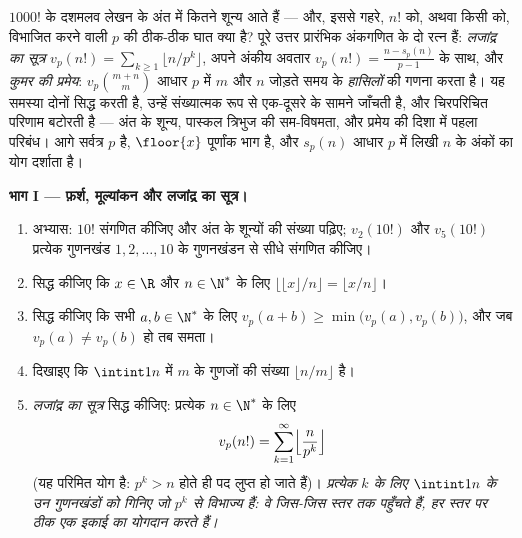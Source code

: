\begin{problem}\label{pb:b1:arith:1}
$1000!$ के दशमलव लेखन के अंत में कितने शून्य आते हैं --- और, इससे गहरे, $n!$
को, अथवा किसी  को, विभाजित करने वाली  $p$ की ठीक-ठीक घात
क्या है? पूरे उत्तर प्रारंभिक अंकगणित के दो रत्न हैं: \emph{लजांद्र का
सूत्र}  $v_p(n!) = \sum_{k\geq1} \lfloor n/p^k
\rfloor$, अपने अंकीय अवतार $v_p(n!) = \frac{n - s_p(n)}{p-1}$ के साथ, और
\emph{कुमर की प्रमेय}: $v_p\binom{m+n}m$ आधार $p$ में
$m$ और $n$ जोड़ते समय के \emph{हासिलों} की गणना करता है। यह समस्या दोनों
सिद्ध करती है, उन्हें संख्यात्मक रूप से एक-दूसरे के सामने जाँचती है, और
चिरपरिचित परिणाम बटोरती है --- अंत के शून्य, पास्कल त्रिभुज की सम-विषमता, और
 प्रमेय की दिशा में पहला परिबंध। आगे सर्वत्र $p$  है,
$\floor{x}$ पूर्णांक भाग है, और $s_p(n)$ आधार $p$ में लिखी $n$ के अंकों का
योग दर्शाता है।

\medskip \noindent\textbf{भाग I --- फ़र्श, मूल्यांकन और लजांद्र का सूत्र।}
\begin{enumerate}
  \item अभ्यास: $10!$ संगणित कीजिए और अंत के शून्यों की संख्या पढ़िए;
  $v_2(10!)$ और $v_5(10!)$ प्रत्येक गुणनखंड $1, 2, \dots, 10$ के गुणनखंडन से
  सीधे संगणित कीजिए।
  \item सिद्ध कीजिए कि $x \in \R$ और $n \in \N^*$ के लिए $\bigl\lfloor
  \lfloor x \rfloor / n \bigr\rfloor = \lfloor x/n \rfloor$।
  \item सिद्ध कीजिए कि सभी $a, b \in \N^*$ के लिए $v_p(a + b) \geq
  \min\bigl(v_p(a), v_p(b)\bigr)$, और जब $v_p(a) \neq v_p(b)$ हो तब समता।
  \item दिखाइए कि $\intint1n$ में $m$ के गुणजों की संख्या $\lfloor n/m
  \rfloor$ है।
  \item \emph{लजांद्र का सूत्र} सिद्ध कीजिए: प्रत्येक $n \in \N^*$ के लिए
        \[
        v_p(n!) = \sum_{k=1}^{\infty}
        \Bigl\lfloor \frac{n}{p^k} \Bigr\rfloor
        \]
        (यह परिमित योग है: $p^k > n$ होते ही पद लुप्त हो जाते हैं)।
        \emph{प्रत्येक $k$ के लिए $\intint1n$ के उन गुणनखंडों को गिनिए जो
        $p^k$ से विभाज्य हैं: वे जिस-जिस स्तर तक पहुँचते हैं, हर स्तर पर ठीक
        एक इकाई का योगदान करते हैं।}
\end{enumerate}


\end{problem}
